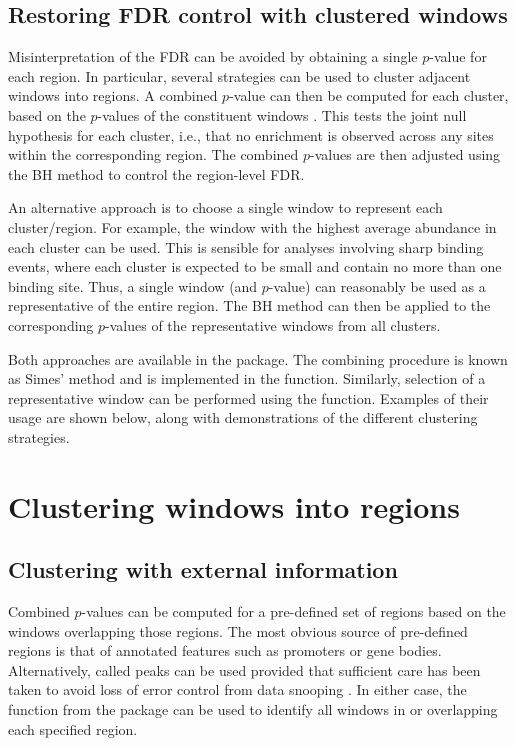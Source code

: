 \documentclass{report}\usepackage[]{graphicx}\usepackage[usenames,dvipsnames]{color}
\begin{document}

\subsection{Restoring FDR control with clustered windows}
Misinterpretation of the FDR can be avoided by obtaining a single $p$-value for each region.
In particular, several strategies can be used to cluster adjacent windows into regions.
A combined $p$-value can then be computed for each cluster, based on the $p$-values of the constituent windows \cite{simes1986}.
This tests the joint null hypothesis for each cluster, i.e., that no enrichment is observed across any sites within the corresponding region. 
The combined $p$-values are then adjusted using the BH method to control the region-level FDR.

An alternative approach is to choose a single window to represent each cluster/region.
For example, the window with the highest average abundance in each cluster can be used.
This is sensible for analyses involving sharp binding events, where each cluster is expected to be small and contain no more than one binding site.
Thus, a single window (and $p$-value) can reasonably be used as a representative of the entire region.
The BH method can then be applied to the corresponding $p$-values of the representative windows from all clusters.

Both approaches are available in the  package.
The combining procedure is known as Simes' method and is implemented in the  function.
Similarly, selection of a representative window can be performed using the  function.
Examples of their usage are shown below, along with demonstrations of the different clustering strategies.

\section{Clustering windows into regions}

\subsection{Clustering with external information}
Combined $p$-values can be computed for a pre-defined set of regions based on the windows overlapping those regions. 
The most obvious source of pre-defined regions is that of annotated features such as promoters or gene bodies.
Alternatively, called peaks can be used provided that sufficient care has been taken to avoid loss of error control from data snooping \cite{lun2014}.
In either case, the  function from the  package can be used to identify all windows in or overlapping each specified region. 
\end{document}
